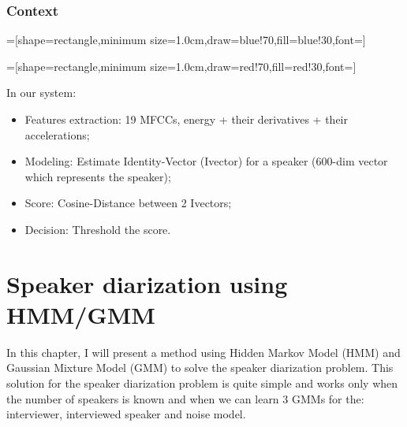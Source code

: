 \documentclass{techrep} %
\begin{document}
\subsection{Context}

=[shape=rectangle,minimum
  size=1.0cm,draw=blue!70,fill=blue!30,font=\small]

=[shape=rectangle,minimum
  size=1.0cm,draw=red!70,fill=red!30,font=\small]

  \begin{center}
  \end{center}

  In our system:
  \begin{itemize}
    \item Features extraction: 19 MFCCs, energy + their derivatives +
      their accelerations;
    \item Modeling: Estimate Identity-Vector (Ivector) for a speaker
      (600-dim vector which represents the speaker);
    \item Score: Cosine-Distance between 2 Ivectors;
    \item Decision: Threshold the score.
  \end{itemize}  
\chapter{Speaker diarization using HMM/GMM}

In this chapter, I will present a method using Hidden Markov Model
(HMM) and Gaussian Mixture Model (GMM) to solve the speaker
diarization problem. This solution for the speaker diarization problem
is quite simple and works only when the number of speakers is known
and when we can learn 3 GMMs for the: interviewer, interviewed speaker
and noise model.
\end{document}
